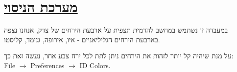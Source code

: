 \documentclass[a4paper, 12pt]{article}
\begin{document}
    \vfill


    \pagebreak %

    \section{\underline{מערכת הניסוי}}
    \begin{flushright}
        במעבדה זו נשתמש במחשב להדמית תצפית על ארבעת הירחים של צדק,
        אנחנו נצפה בארבעת הירחים הגליליאניים - איו, אירופה, גנימד, קליסטו.

        על מנת שיהיה קל יותר לזהות את הירחים ניתן לתת לכל ירח צבע אחר, נעשה זאת כך:\\
        \textenglish{File $\rightarrow$ Preferences $\rightarrow$ ID Colors}.
    \end{flushright}

    \pagebreak %
\end{document}
